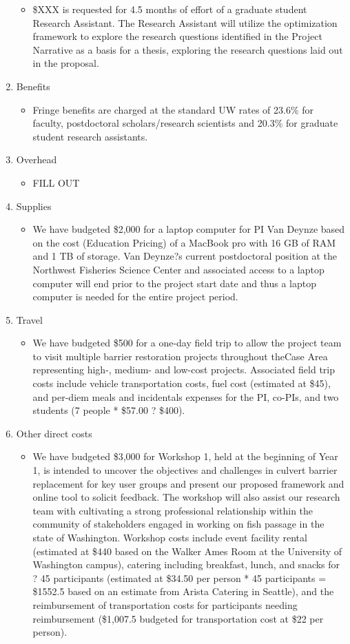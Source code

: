 \begin{enumerate}
\begin{itemize}
\item \$XXX is requested for 4.5 months of effort of a graduate student Research Assistant. The Research Assistant will utilize the optimization framework to explore the research questions identified in the Project Narrative as a basis for a thesis, exploring the research questions laid out in the proposal.
\end{itemize}
\item Benefits
\begin{itemize}
\item Fringe benefits are charged at the standard UW rates of 23.6\% for faculty, postdoctoral scholars/research scientists and 20.3\% for graduate student research assistants. 
\end{itemize}
\item Overhead
\begin{itemize}
\item FILL OUT
\end{itemize}
\item Supplies
\begin{itemize}
\item We have budgeted \$2,000 for a laptop computer for PI Van Deynze based on the cost (Education Pricing) of a MacBook pro with 16 GB of RAM and 1 TB of storage. Van Deynze?s current postdoctoral position at the Northwest Fisheries Science Center and associated access to a laptop computer will end prior to the project start date and thus a laptop computer is needed for the entire project period.
\end{itemize}
\item Travel
\begin{itemize}
\item We have budgeted \$500 for a one-day field trip to allow the project team to visit multiple barrier restoration projects throughout theCase Area representing high-, medium- and low-cost projects. Associated field trip costs include vehicle transportation costs, fuel cost (estimated at \$45), and per-diem meals and incidentals expenses for the PI, co-PIs, and two students (7 people * \$57.00 ? \$400).
\end{itemize}
\item Other direct costs
\begin{itemize}
\item We have budgeted \$3,000 for Workshop 1, held at the beginning of Year 1, is intended to uncover the objectives and challenges in culvert barrier replacement for key user groups and present our proposed framework and online tool to solicit feedback. The workshop will also assist our research team with cultivating a strong professional relationship within the community of stakeholders engaged in working on fish passage in the state of Washington. Workshop costs include event facility rental (estimated at \$440 based on the Walker Ames Room at the University of Washington campus), catering including breakfast, lunch, and snacks for ? 45 participants (estimated at \$34.50 per person * 45 participants = \$1552.5 based on an estimate from Arista Catering in Seattle), and the reimbursement of transportation costs for participants needing reimbursement (\$1,007.5 budgeted for transportation cost at \$22 per person).

\end{itemize}
\end{enumerate}
